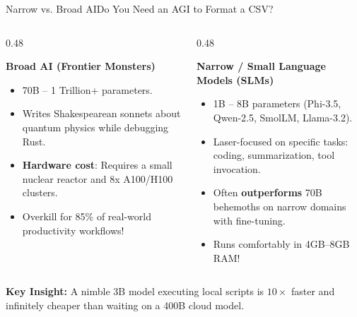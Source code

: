 \documentclass[10pt,aspectratio=169]{beamer}
\begin{document}
\begin{frame}{Narrow vs. Broad AI}{Do You Need an AGI to Format a CSV?}
    \begin{columns}[T]
        \begin{column}{0.48\textwidth}
            \begin{block}{\textbf{Broad AI (Frontier Monsters)}}
                \begin{itemize}
                    \item 70B -- 1 Trillion+ parameters.
                    \item Writes Shakespearean sonnets about quantum physics while debugging Rust.
                    \item \textbf{Hardware cost}: Requires a small nuclear reactor and 8x A100/H100 clusters.
                    \item Overkill for 85\% of real-world productivity workflows!
                \end{itemize}
            \end{block}
        \end{column}
        \begin{column}{0.48\textwidth}
            \begin{exampleblock}{\textbf{Narrow / Small Language Models (SLMs)}}
                \begin{itemize}
                    \item 1B -- 8B parameters (Phi-3.5, Qwen-2.5, SmolLM, Llama-3.2).
                    \item Laser-focused on specific tasks: coding, summarization, tool invocation.
                    \item Often \textbf{outperforms} 70B behemoths on narrow domains with fine-tuning.
                    \item Runs comfortably in 4GB--8GB RAM!
                \end{itemize}
            \end{exampleblock}
        \end{column}
    \end{columns}
    \vspace{0.3cm}
    \centering
    \alert{\textbf{Key Insight:}} A nimble 3B model executing local scripts is $10\times$ faster and infinitely cheaper than waiting on a 400B cloud model.
\end{frame}
\end{document}
